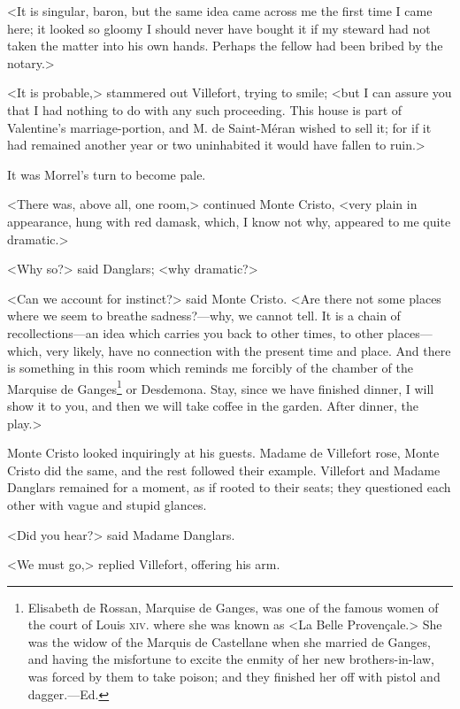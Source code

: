  <It is singular, baron, but the same idea came across me the first time I came here; it looked so gloomy I should never have bought it if my steward had not taken the matter into his own hands. Perhaps the fellow had been bribed by the notary.> 

 <It is probable,> stammered out Villefort, trying to smile; <but I can assure you that I had nothing to do with any such proceeding. This house is part of Valentine's marriage-portion, and M. de Saint-Méran wished to sell it; for if it had remained another year or two uninhabited it would have fallen to ruin.> 

 It was Morrel's turn to become pale. 

 <There was, above all, one room,> continued Monte Cristo, <very plain in appearance, hung with red damask, which, I know not why, appeared to me quite dramatic.> 

 <Why so?> said Danglars; <why dramatic?> 

 <Can we account for instinct?> said Monte Cristo. <Are there not some places where we seem to breathe sadness?—why, we cannot tell. It is a chain of recollections—an idea which carries you back to other times, to other places—which, very likely, have no connection with the present time and place. And there is something in this room which reminds me forcibly of the chamber of the Marquise de Ganges\footnote{Elisabeth de Rossan, Marquise de Ganges, was one of the famous women of the court of Louis \textsc{xiv.} where she was known as <La Belle Provençale.> She was the widow of the Marquis de Castellane when she married de Ganges, and having the misfortune to excite the enmity of her new brothers-in-law, was forced by them to take poison; and they finished her off with pistol and dagger.—Ed.} or Desdemona. Stay, since we have finished dinner, I will show it to you, and then we will take coffee in the garden. After dinner, the play.> 

 Monte Cristo looked inquiringly at his guests. Madame de Villefort rose, Monte Cristo did the same, and the rest followed their example. Villefort and Madame Danglars remained for a moment, as if rooted to their seats; they questioned each other with vague and stupid glances. 

 <Did you hear?> said Madame Danglars. 

 <We must go,> replied Villefort, offering his arm. 

